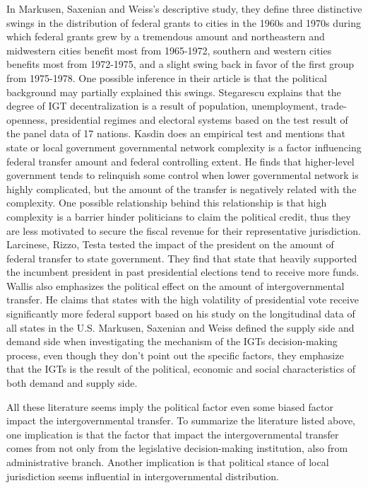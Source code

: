 In Markusen, Saxenian and Weiss's \cite{markusen1981benefits} descriptive study, they define three distinctive swings in the distribution of federal grants to cities in the 1960s and 1970s during which federal grants grew by a tremendous amount and northeastern and midwestern cities benefit most from 1965-1972, southern and western cities benefits most from 1972-1975, and a slight swing back in favor of the first group from 1975-1978. One possible inference in their article is that the political background may partially explained this swings. Stegarescu \cite{stegarescu2006decentralised} explains that the degree of IGT decentralization is a result of population, unemployment, trade-openness, presidential regimes and electoral systems based on the test result of the panel data of 17 nations. Kasdin \cite{kasdin2016decision} does an empirical test and mentions that state or local government governmental network complexity is a factor influencing federal transfer amount and federal controlling extent. He finds that higher-level government tends to relinquish some control when lower governmental network is highly complicated, but the amount of the transfer is negatively related with the complexity. One possible relationship behind this relationship is that high complexity is a barrier hinder politicians to claim the political credit, thus they are less motivated to secure the fiscal revenue for their representative jurisdiction. Larcinese, Rizzo, Testa \cite{larcinese2006allocating} tested the impact of the president on the amount of federal transfer to state government. They find that state that heavily supported the incumbent president in past presidential elections tend to receive more funds. Wallis \cite{wallis1987employment} also emphasizes the political effect on the amount of intergovernmental transfer. He claims that states with the high volatility of presidential vote receive significantly more federal support based on his study on the longitudinal data of all states in the U.S. Markusen, Saxenian and Weiss \cite{markusen1981benefits} defined the supply side and demand side when investigating the mechanism of the IGTs decision-making process, even though they don’t point out the specific factors, they emphasize that the IGTs is the result of the political, economic and social characteristics of both demand and supply side.

All these literature seems imply the political factor even some biased factor impact the intergovernmental transfer. To summarize the literature listed above, one implication is that the factor that impact the intergovernmental transfer comes from not only from the legislative decision-making institution, also from administrative branch. Another implication is that political stance of local jurisdiction seems influential in intergovernmental distribution.

